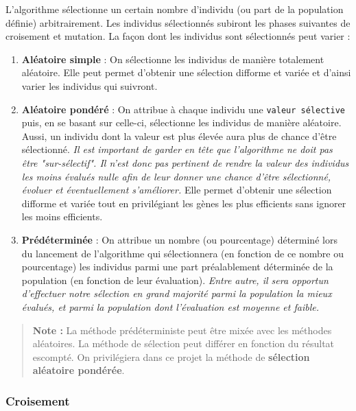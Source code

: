 L'algorithme sélectionne un certain nombre d'individu (ou part de la
population définie) arbitrairement. Les individus sélectionnés subiront
les phases suivantes de croisement et mutation. La façon dont les
individus sont sélectionnés peut varier :

\begin{enumerate}
\def\labelenumi{\arabic{enumi}.}
\tightlist
\item
  \textbf{Aléatoire simple} : On sélectionne les individus de manière
  totalement aléatoire. Elle peut permet d'obtenir une sélection
  difforme et variée et d'ainsi varier les individus qui suivront.
\item
  \textbf{Aléatoire pondéré} : On attribue à chaque individu une
  \texttt{valeur\ sélective} puis, en se basant sur celle-ci,
  sélectionne les individus de manière aléatoire. Aussi, un individu
  dont la valeur est plus élevée aura plus de chance d'être sélectionné.
  \emph{Il est important de garder en tête que l'algorithme ne doit pas
  être "sur-sélectif". Il n'est donc pas pertinent de rendre la valeur
  des individus les moins évalués nulle afin de leur donner une chance
  d'être sélectionné, évoluer et éventuellement s'améliorer.} Elle
  permet d'obtenir une sélection difforme et variée tout en privilégiant
  les gènes les plus efficients sans ignorer les moins efficients.
\item
  \textbf{Prédéterminée} : On attribue un nombre (ou pourcentage)
  déterminé lors du lancement de l'algorithme qui sélectionnera (en
  fonction de ce nombre ou pourcentage) les individus parmi une part
  préalablement déterminée de la population (en fonction de leur
  évaluation). \emph{Entre autre, il sera opportun d'effectuer notre
  sélection en grand majorité parmi la population la mieux évalués, et
  parmi la population dont l'évaluation est moyenne et faible.}
\end{enumerate}

\begin{quote}
\textbf{Note :} La méthode prédéterministe peut être mixée avec les
méthodes aléatoires. La méthode de sélection peut différer en fonction
du résultat escompté. On privilégiera dans ce projet la méthode de
\textbf{sélection aléatoire pondérée}.
\end{quote}

\hypertarget{croisement}{%
\subsubsection{Croisement}\label{croisement}}

